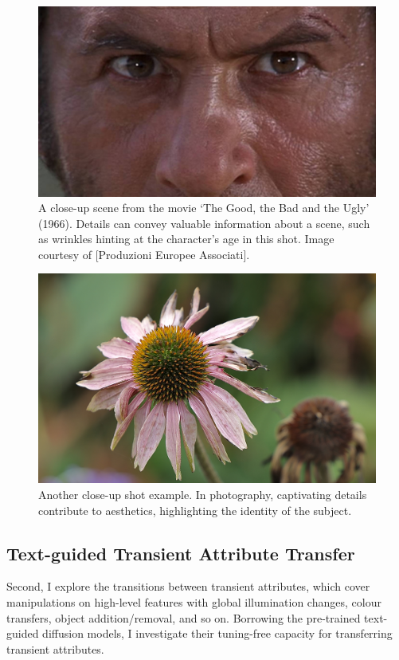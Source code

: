 \begin{figure}[ht]
  \centering

    \includegraphics[width=0.78\linewidth]{Images/A scene from ‘The Good, the Bad and the Ugly’ (1966). Image courtesy- Produzioni Europee Associati .jpg}

   \caption{A close-up scene from the movie ‘The Good, the Bad and the Ugly’ (1966). Details can convey valuable information about a scene, such as wrinkles hinting at the character's age in this shot. Image courtesy of [Produzioni Europee Associati].}
   \label{fig:close-up1}
\end{figure}


\begin{figure}%
  \centering
   \includegraphics[width=0.75\linewidth]{Images/flower-closeup.JPG}
   
   \caption{Another close-up shot example. In photography, captivating details contribute to aesthetics, highlighting the identity of the subject.}
   \label{fig:close-up2}
\end{figure}


\newpage
\subsection{Text-guided Transient Attribute Transfer} 
Second, I explore the transitions between transient attributes, which cover manipulations on high-level features with global illumination changes, colour transfers, object addition/removal, and so on. Borrowing the pre-trained text-guided diffusion models, I investigate their tuning-free capacity for transferring transient attributes.

